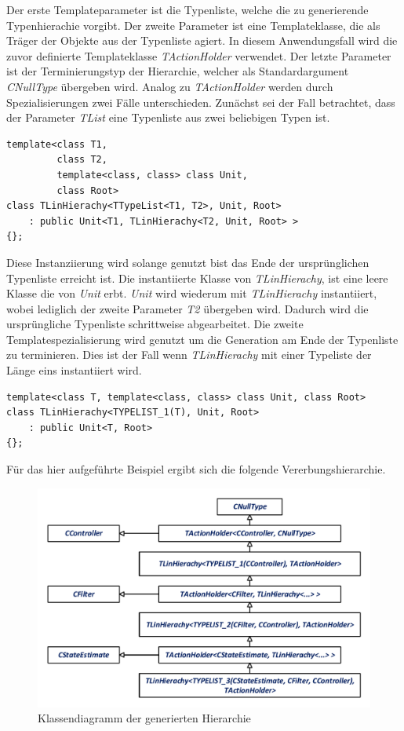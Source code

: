 Der erste Templateparameter ist die Typenliste, welche die zu generierende Typenhierachie vorgibt. Der zweite Parameter ist eine Templateklasse, die als Träger der Objekte aus der Typenliste agiert. In diesem Anwendungsfall wird die zuvor definierte Templateklasse \textit{TActionHolder} verwendet. Der letzte Parameter ist der Terminierungstyp der Hierarchie, welcher als Standardargument \textit{CNullType} übergeben wird. Analog zu \textit{TActionHolder} werden durch Spezialisierungen zwei Fälle unterschieden. Zunächst sei der Fall betrachtet, dass der Parameter \textit{TList} eine Typenliste aus zwei beliebigen Typen ist.
\begin{lstlisting}[caption={Erste Templatespezialisierung der linearen Hierarchie {\cite[S. 64]{ModernCpp}} },captionpos=b]
template<class T1, 
         class T2, 
         template<class, class> class Unit, 
         class Root>
class TLinHierachy<TTypeList<T1, T2>, Unit, Root>
	: public Unit<T1, TLinHierachy<T2, Unit, Root> >
{};
\end{lstlisting}
Diese Instanziierung wird solange genutzt bist das Ende der ursprünglichen Typenliste erreicht ist. Die instantiierte Klasse von \textit{TLinHierachy}, ist eine leere Klasse die von \textit{Unit} erbt. \textit{Unit} wird wiederum mit \textit{TLinHierachy} instantiiert, wobei lediglich der zweite Parameter \textit{T2} übergeben wird. Dadurch wird die ursprüngliche Typenliste schrittweise abgearbeitet.
Die zweite Templatespezialisierung wird genutzt um die Generation am Ende der Typenliste zu terminieren. Dies ist der Fall wenn \textit{TLinHierachy} mit einer Typeliste der Länge eins instantiiert wird.
\begin{lstlisting}[caption={Zweite Templatespezialisierung der linearen Hierarchie {\cite[S. 64]{ModernCpp}} },captionpos=b]
template<class T, template<class, class> class Unit, class Root>
class TLinHierachy<TYPELIST_1(T), Unit, Root>
	: public Unit<T, Root>
{};
\end{lstlisting}
Für das hier aufgeführte Beispiel ergibt sich die folgende Vererbungshierarchie.
\begin{figure}[!h]
\centering
\includegraphics[width=0.7\linewidth]{img/SW_1_Signalfluss_KD.pdf}
\caption{Klassendiagramm der generierten Hierarchie}
\end{figure}
